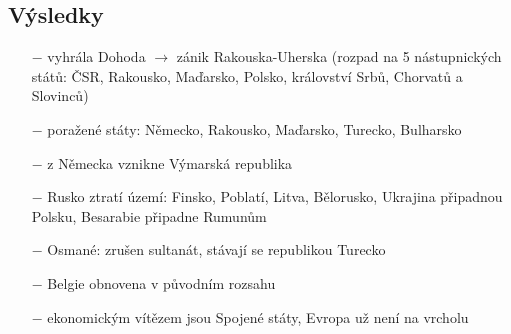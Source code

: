 \documentclass{article}
\begin{document}
\subsection*{Výsledky}
\begin{itemize}
    \vspace{-0.5em}
    \setlength\itemsep{0.15em}
    \item[$-$] vyhrála Dohoda $\rightarrow$ zánik Rakouska-Uherska (rozpad na 5 nástupnických států: ČSR, Rakousko, Maďarsko, Polsko, království Srbů, Chorvatů a Slovinců)
    \item[$-$] poražené státy: Německo, Rakousko, Maďarsko, Turecko, Bulharsko
    \item[$-$] z Německa vznikne Výmarská republika
    \item[$-$] Rusko ztratí území: Finsko, Poblatí, Litva, Bělorusko, Ukrajina připadnou Polsku, Besarabie připadne Rumunům
    \item[$-$] Osmané: zrušen sultanát, stávají se republikou Turecko
    \item[$-$] Belgie obnovena v původním rozsahu
    \item[$-$] ekonomickým vítězem jsou Spojené státy, Evropa už není na vrcholu
\end{itemize}
\end{document}
